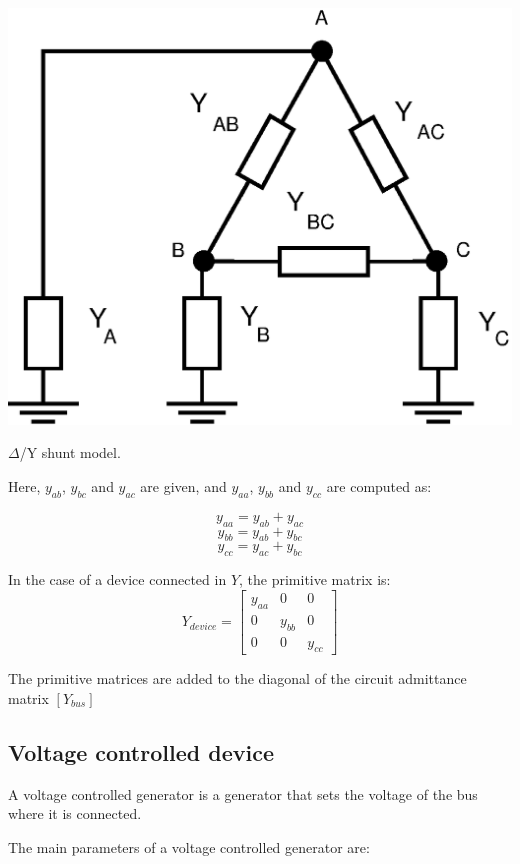 \documentclass[nols,a4paper,twoside,notoc,fleqn]{tufte-book}
\begin{document}
\begin{marginfigure}
	\includegraphics[width=0.99\linewidth]{img/DeltaShuntDevice.eps}
	\caption{$\Delta$/Y shunt model.}
	\label{delta_shunt_model}
\end{marginfigure}

Here, $y_{ab}$, $y_{bc}$ and $y_{ac}$ are given, and $y_{aa}$, $y_{bb}$ and $y_{cc}$ are computed as:

$$y_{aa} = y_{ab} + y_{ac}$$
$$y_{bb} = y_{ab} + y_{bc}$$
$$y_{cc} = y_{ac} + y_{bc}$$

In the case of a device connected in $Y$, the primitive matrix is:
\begin{equation}
Y_{device} = \left[ \begin{array}{ccc}
y_{aa} & 0 &  0 \\
0 & y_{bb} & 0 \\  
0 & 0 & y_{cc}
\end{array} \right] 
\end{equation}

The primitive matrices are added to the diagonal of the circuit admittance matrix $[Y_{bus}]$

\subsection{Voltage controlled device}

A voltage controlled generator is a generator that sets the voltage of the bus where it is connected.

The main parameters of a voltage controlled generator are:\\
\end{document}
